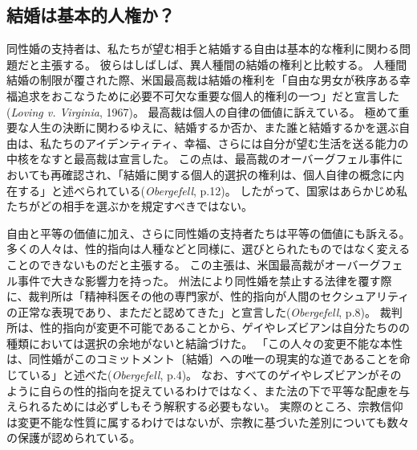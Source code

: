 \documentclass[paper=a4,book,openany]{jlreq}
\begin{document}
\subsection{結婚は基本的人権か？}

同性婚の支持者は、私たちが望む相手と結婚する自由は基本的な権利に関わる問題だと主張する。
彼らはしばしば、異人種間の結婚の権利と比較する。
人種間結婚の制限が覆された際、米国最高裁は結婚の権利を「自由な男女が秩序ある幸福追求をおこなうために必要不可欠な重要な個人的権利の一つ」だと宣言した(\emph{Loving v. Virginia}, 1967)。
最高裁は個人の自律の価値に訴えている。
極めて重要な人生の決断に関わるゆえに、結婚するか否か、また誰と結婚するかを選ぶ自由は、私たちのアイデンティティ、幸福、さらには自分が望む生活を送る能力の中核をなすと最高裁は宣言した。
この点は、最高裁のオーバーグフェル事件においても再確認され、「結婚に関する個人的選択の権利は、個人自律の概念に内在する」と述べられている(\emph{Obergefell}, p.12)。
したがって、国家はあらかじめ私たちがどの相手を選ぶかを規定すべきではない。

自由と平等の価値に加え、さらに同性婚の支持者たちは平等の価値にも訴える。
多くの人々は、性的指向は人種などと同様に、選びとられたものではなく変えることのできないものだと主張する。
この主張は、米国最高裁がオーバーグフェル事件で大きな影響力を持った。
州法により同性婚を禁止する法律を覆す際に、裁判所は「精神科医その他の専門家が、性的指向が人間のセクシュアリティの正常な表現であり、まただと認めてきた」と宣言した(\emph{Obergefell}, p.8)。
裁判所は、性的指向が変更不可能であることから、ゲイやレズビアンは自分たちのの種類においては選択の余地がないと結論づけた。
「この人々の変更不能な本性は、同性婚がこのコミットメント〔結婚〕への唯一の現実的な道であることを命じている」と述べた(\emph{Obergefell}, p.4)。
なお、すべてのゲイやレズビアンがそのように自らの性的指向を捉えているわけではなく、また法の下で平等な配慮を与えられるためには必ずしもそう解釈する必要もない。
実際のところ、宗教信仰は変更不能な性質に属するわけではないが、宗教に基づいた差別についても数々の保護が認められている。
\end{document}
